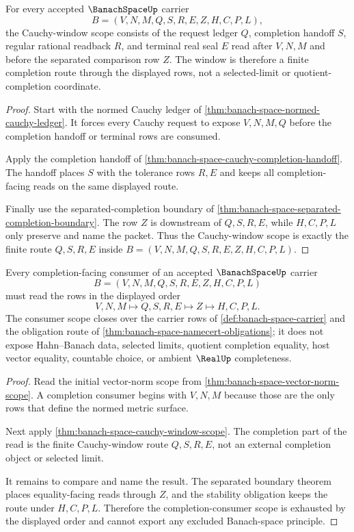 \begin{theorem}
\label{thm:banach-space-cauchy-window-scope}
For every accepted $\BanachSpaceUp$ carrier
$$
B=(V,N,M,Q,S,R,E,Z,H,C,P,L),
$$
the Cauchy-window scope consists of the request ledger $Q$, completion handoff $S$, regular rational readback $R$, and terminal real seal $E$ read after $V,N,M$ and before the separated comparison row $Z$. The window is therefore a finite completion route through the displayed rows, not a selected-limit or quotient-completion coordinate.
\end{theorem}
\begin{proof}
Start with the normed Cauchy ledger of \autoref{thm:banach-space-normed-cauchy-ledger}. It forces every Cauchy request to expose $V,N,M,Q$ before the completion handoff or terminal rows are consumed.

Apply the completion handoff of \autoref{thm:banach-space-cauchy-completion-handoff}. The handoff places $S$ with the tolerance rows $R,E$ and keeps all completion-facing reads on the same displayed route.

Finally use the separated-completion boundary of \autoref{thm:banach-space-separated-completion-boundary}. The row $Z$ is downstream of $Q,S,R,E$, while $H,C,P,L$ only preserve and name the packet. Thus the Cauchy-window scope is exactly the finite route $Q,S,R,E$ inside $B=(V,N,M,Q,S,R,E,Z,H,C,P,L)$.
\end{proof}

\begin{theorem}
\label{thm:banach-space-completion-consumer-scope}
Every completion-facing consumer of an accepted $\BanachSpaceUp$ carrier
$$
B=(V,N,M,Q,S,R,E,Z,H,C,P,L)
$$
must read the rows in the displayed order
$$
V,N,M \longmapsto Q,S,R,E \longmapsto Z \longmapsto H,C,P,L .
$$
The consumer scope closes over the carrier rows of \autoref{def:banach-space-carrier} and the obligation route of \autoref{thm:banach-space-namecert-obligations}; it does not expose Hahn--Banach data, selected limits, quotient completion equality, host vector equality, countable choice, or ambient $\RealUp$ completeness.
\end{theorem}
\begin{proof}
Read the initial vector-norm scope from \autoref{thm:banach-space-vector-norm-scope}. A completion consumer begins with $V,N,M$ because those are the only rows that define the normed metric surface.

Next apply \autoref{thm:banach-space-cauchy-window-scope}. The completion part of the read is the finite Cauchy-window route $Q,S,R,E$, not an external completion object or selected limit.

It remains to compare and name the result. The separated boundary theorem places equality-facing reads through $Z$, and the stability obligation keeps the route under $H,C,P,L$. Therefore the completion-consumer scope is exhausted by the displayed order and cannot export any excluded Banach-space principle.
\end{proof}

